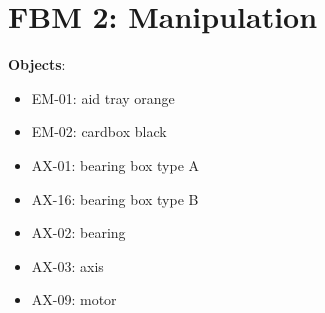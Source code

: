 \section*{FBM 2: Manipulation}


\vspace{0.2cm}

\noindent \textbf{Objects}:
\begin{itemize}
  \setlength\itemsep{0cm}
	\item EM-01: aid tray orange
	\item EM-02: cardbox black
	\item AX-01: bearing box type A
	\item AX-16: bearing box type B
	\item AX-02: bearing
	\item AX-03: axis
	\item AX-09: motor
\end{itemize}

\vspace{0.2cm}




